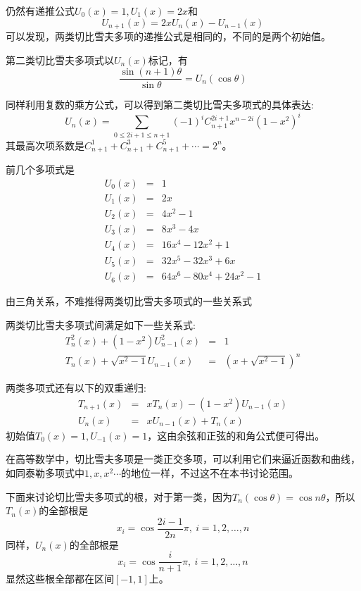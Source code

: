 仍然有递推公式$U_0(x)=1, U_1(x)=2x$和
\begin{equation*}
  U_{n+1}(x)=2xU_n(x)-U_{n-1}(x)
\end{equation*}
可以发现，两类切比雪夫多项的递推公式是相同的，不同的是两个初始值。

第二类切比雪夫多项式以$U_n(x)$标记，有
\begin{equation*}
  \frac{\sin{(n+1)\theta}}{\sin{\theta}} = U_n(\cos{\theta})
\end{equation*}

同样利用复数的乘方公式，可以得到第二类切比雪夫多项式的具体表达:
\begin{equation*}
  U_n(x) = \sum_{0 \leqslant 2i+1 \leqslant n+1}(-1)^iC_{n+1}^{2i+1}x^{n-2i}(1-x^2)^{i}
\end{equation*}
其最高次项系数是$C_{n+1}^1+C_{n+1}^3+C_{n+1}^5+\cdots=2^n$。

前几个多项式是
\begin{eqnarray*}
  U_0(x) & = & 1 \\
  U_1(x) & = & 2x \\
  U_2(x) & = & 4x^2-1 \\
  U_3(x) & = & 8x^3-4x \\
  U_4(x) & = & 16x^4-12x^2+1 \\
  U_5(x) & = & 32x^5-32x^3+6x \\
  U_6(x) & = & 64x^6-80x^4+24x^2-1
\end{eqnarray*}

由三角关系，不难推得两类切比雪夫多项式的一些关系式
\begin{property}
  两类切比雪夫多项式间满足如下一些关系式:
  \begin{eqnarray*}
    T_n^2(x)+(1-x^2)U_{n-1}^2(x) & = & 1 \\
    T_n(x)+\sqrt{x^2-1}U_{n-1}(x) & = & (x+\sqrt{x^2-1})^n
  \end{eqnarray*}
\end{property}

两类多项式还有以下的双重递归:
\begin{eqnarray*}
  T_{n+1}(x) & = & xT_n(x)-(1-x^2)U_{n-1}(x) \\
  U_n(x) & = & xU_{n-1}(x)+T_n(x)
\end{eqnarray*}
初始值$T_0(x)=1, U_{-1}(x)=1$，这由余弦和正弦的和角公式便可得出。

在高等数学中，切比雪夫多项是一类正交多项，可以利用它们来逼近函数和曲线，如同泰勒多项式中$1,x,x^2\cdots$的地位一样，不过这不在本书讨论范围。

下面来讨论切比雪夫多项式的根，对于第一类，因为$T_n(\cos{\theta})=\cos{n\theta}$，所以$T_n(x)$的全部根是
\begin{equation*}
  x_i=\cos{\frac{2i-1}{2n}\pi}, \  i=1,2,\ldots,n
\end{equation*}
同样，$U_n(x)$的全部根是
\begin{equation*}
  x_i=\cos{\frac{i}{n+1}\pi}, \  i=1,2,\ldots,n
\end{equation*}
显然这些根全部都在区间$[-1,1]$上。



